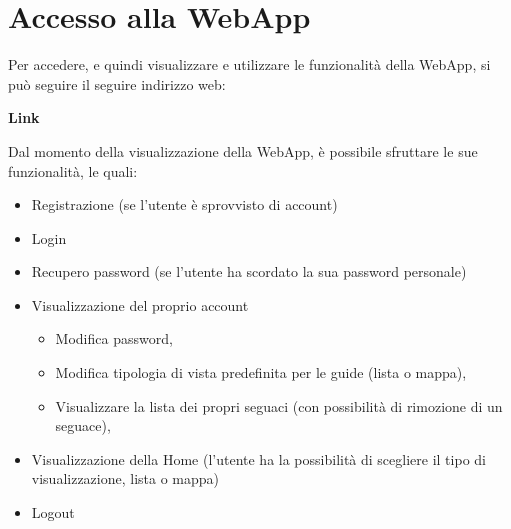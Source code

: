 \section{Accesso alla WebApp} {
    Per accedere, e quindi visualizzare e utilizzare le funzionalità della WebApp, si può seguire il seguire indirizzo web:
    
    \begin{center}
        \textbf{Link}
    \end{center}



    Dal momento della visualizzazione della WebApp, è possibile sfruttare le sue funzionalità, le quali:
    \begin{itemize}
        \item Registrazione (se l'utente è sprovvisto di account)
        \item Login 
        \item Recupero password (se l'utente ha scordato la sua password personale)
        \item Visualizzazione del proprio account \begin{itemize}
            \item Modifica password,
            \item Modifica tipologia di vista predefinita per le guide (lista o mappa),
            \item Visualizzare la lista dei propri seguaci (con possibilità di rimozione di un seguace),
        \end{itemize}
        \item Visualizzazione della Home (l'utente ha la possibilità di scegliere il tipo di visualizzazione, lista o mappa)
        \item Logout
    \end{itemize}

}
